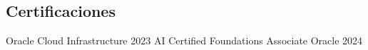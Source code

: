 \documentclass[]{awesome-cv}
\begin{document}
\vspace{-7mm}
\subsection*{Certificaciones}
\begin{cventries}
	\vspace{-1mm}
	\cventry
	{}
	{Oracle Cloud Infrastructure 2023 AI Certified Foundations Associate \vspace{-5mm}}
	{Oracle \vspace{-5mm}}
	{2024 \vspace{-5mm}}
	{}
\end{cventries}
\end{document}
